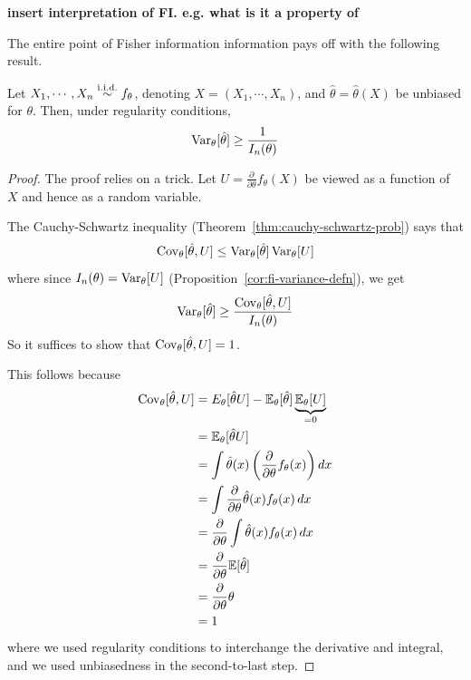 \documentclass[../../../main.tex]{subfiles}
\begin{document}
\begin{remark}
    \textbf{insert interpretation of FI. e.g. what is it a property of}

    The entire point of Fisher information information pays off with the following result.
\end{remark}

\begin{theorem}
    Let $X_1,\cdots,X_n\overset{\mathrm{i.i.d.}}{\sim} f_\theta$, denoting $X=(X_1,\cdots,X_n)$, and $\hat \theta=\hat \theta(X)$ be unbiased for $\theta$.
    Then, under regularity conditions,
    \begin{equation*}
        \operatorname{Var}_\theta[\hat \theta]\geq \frac{1}{I_n(\theta)}
    \end{equation*}
    \begin{proof}
        The proof relies on a trick. Let $U=\frac{\partial}{\partial \theta}f_\theta(X)$ be viewed as a function of $X$ and hence as a random variable.

        The Cauchy-Schwartz inequality (Theorem~\ref{thm:cauchy-schwartz-prob}) says that
        \begin{equation*}
            \operatorname{Cov}_\theta[\hat \theta,U]\leq \operatorname{Var}_\theta[\hat \theta]\operatorname{Var}_\theta[U]
        \end{equation*}
        where since $I_n(\theta)=\operatorname{Var}_\theta[U]$ (Proposition~\ref{cor:fi-variance-defn}), we get
        \begin{equation*}
            \operatorname{Var}_\theta[\hat \theta] \geq \frac{\operatorname{Cov}_\theta[\hat \theta,U]}{I_n(\theta)}
        \end{equation*}
        So it suffices to show that $\operatorname{Cov}_\theta[\hat \theta,U]=1$.

        This follows because
        \begin{align*}
            \operatorname{Cov}_\theta[\hat \theta,U]&=E_\theta[\hat \theta U]-\mathbb{E}_\theta[\hat \theta]\underbrace{\mathbb{E}_\theta[U]}_{=0}\\
            &=\mathbb{E}_\theta[\hat \theta U]\\
            &=\int \hat \theta(x) \left(\frac{\partial}{\partial \theta}f_\theta(x)\right)dx\\
            &=\int \frac{\partial}{\partial \theta}\hat\theta(x) f_\theta(x)\,dx\\
            &=\frac{\partial}{\partial \theta} \int \hat\theta(x) f_\theta(x)\,dx\\
            &=\frac{\partial}{\partial \theta}\mathbb{E}[\hat \theta]\\
            &=\frac{\partial}{\partial \theta}\theta\\
            &=1
        \end{align*}
        where we used regularity conditions to interchange the derivative and integral, and we used unbiasedness in the second-to-last step.
    \end{proof}
\end{theorem}
\end{document}
